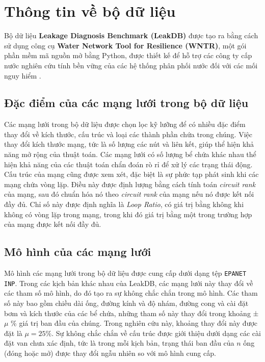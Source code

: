 \section{Thông tin về bộ dữ liệu}

Bộ dữ liệu \textbf{Leakage Diagnosis Benchmark (LeakDB)} được tạo ra bằng cách sử dụng công cụ \textbf{Water Network Tool for Resilience (WNTR)}, một gói phần mềm mã nguồn mở bằng Python, được thiết kế để hỗ trợ các công ty cấp nước nghiên cứu tính bền vững của các hệ thống phân phối nước đối với các mối nguy hiểm \cite{EPANET_EPA}.

\subsection{Đặc điểm của các mạng lưới trong bộ dữ liệu}

Các mạng lưới trong bộ dữ liệu được chọn lọc kỹ lưỡng để có nhiều đặc điểm thay đổi về kích thước, cấu trúc và loại các thành phần chứa trong chúng. Việc thay đổi kích thước mạng, tức là số lượng các nút và liên kết, giúp thể hiện khả năng mở rộng của thuật toán. Các mạng lưới có số lượng bể chứa khác nhau thể hiện khả năng của các thuật toán chẩn đoán rò rỉ để xử lý các trạng thái động. Cấu trúc của mạng cũng được xem xét, đặc biệt là sự phức tạp phát sinh khi các mạng chứa vòng lặp. Điều này được định lượng bằng cách tính toán \textit{circuit rank} của mạng, sau đó chuẩn hóa nó theo \textit{circuit rank} của mạng nếu nó được kết nối đầy đủ. Chỉ số này được định nghĩa là \textit{Loop Ratio}, có giá trị bằng không khi không có vòng lặp trong mạng, trong khi đó giá trị bằng một trong trường hợp của mạng được kết nối đầy đủ.

\subsection{Mô hình của các mạng lưới}

Mô hình các mạng lưới trong bộ dữ liệu được cung cấp dưới dạng tệp \texttt{EPANET INP}. Trong các kịch bản khác nhau của LeakDB, các mạng lưới này thay đổi về các tham số mô hình, do đó tạo ra sự không chắc chắn trong mô hình. Các tham số này bao gồm chiều dài ống, đường kính và độ nhám, đường cong và cài đặt bơm và kích thước của các bể chứa, những tham số này thay đổi trong khoảng ±$\mu$ \% giá trị ban đầu của chúng. Trong nghiên cứu này, khoảng thay đổi này được đặt là $\mu = 25\%$. Sự không chắc chắn về cấu trúc được giới thiệu dưới dạng các cài đặt van chưa xác định, tức là trong mỗi kịch bản, trạng thái ban đầu của $n$ ống (đóng hoặc mở) được thay đổi ngẫu nhiên so với mô hình cung cấp.

